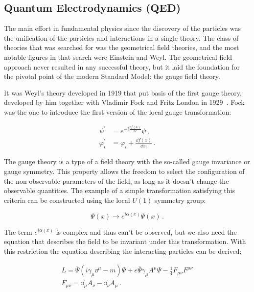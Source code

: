 \subsection{Quantum Electrodynamics (QED)}

The main effort in fundamental physics since the discovery of the particles was the unification of the particles and interactions in a single theory. The class of theories that was searched for was the geometrical field theories, and the most notable figures in that search were Einstein and Weyl. The geometrical field approach never resulted in any successful theory, but it laid the foundation for the pivotal point of the modern Standard Model: the gauge field theory.

It was Weyl's theory developed in 1919 that put basis of the first gauge theory, developed by him together with Vladimir Fock and Fritz London in 1929~\cite{lib:theory_qed_fock, lib:theory_qed_london, lib:theory_qed_weyl}. Fock was the one to introduce the first version of the local gauge transformation:

\begin{equation}
\begin{split}
\psi^{'} &= e^{-i\frac{ef(x)}{hc}}\psi \,,\\
\varphi^{'}_{i} &= \varphi_{i} + \frac{\dd f(x)}{\dd x_{i}} \,.
\end{split}
\end{equation}

The gauge theory is a type of a field theory with the so-called gauge invariance or gauge symmetry. This property allows the freedom to select the configuration of the non-observable parameters of the field, as long as it doesn't change the observable quantities. The example of a simple transformation satisfying this criteria can be constructed using the local $U(1)$ symmetry group:

\begin{equation}
\Psi(x) \to e^{i\alpha(x)}\Psi(x)\,.
\end{equation}

The term $e^{i\alpha(x)}$ is complex and thus can't be observed, but we also need the equation that describes the field to be invariant under this transformation. With this restriction the equation describing the interacting particles can be derived:

\begin{equation}
\begin{gathered}
L = \bar \Psi (i \gamma_{\mu} \dd^{\mu} - m) \Psi + e \bar \Psi \gamma_{\mu} A^{\mu} \Psi - \frac{1}{4} F_{\mu\nu}F^{\mu\nu}\\
F_{\mu\nu} = \dd_{\mu}A_{\nu} - \dd_{\nu}A_{\mu}\,.
\end{gathered}
\end{equation}

